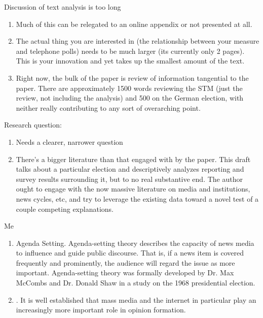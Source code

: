 \documentclass[12pt,a4paper,notitlepage]{article}
\begin{document}
Discussion of text analysis is too long
\begin{enumerate}
	\item Much of this can be relegated to an online appendix or not presented at all. 
	\item The actual thing you are interested in (the relationship between your measure and telephone polls) needs to be much larger (its currently only 2 pages). This is your innovation and yet takes up the smallest amount of the text. 
	\item Right now, the bulk of the paper is review of information tangential to the paper. There are approximately 1500 words reviewing the STM (just the review, not including the analysis) and 500 on the German election, with neither really contributing to any sort of overarching point. 
\end{enumerate}

Research question:
\begin{enumerate}
	\item Needs a clearer, narrower question 
	\item There's a bigger literature than that engaged with by the paper. This draft talks about a particular election and descriptively analyzes reporting and survey results surrounding it, but to no real substantive end. The author ought to engage with the now massive literature on media and institutions, news cycles, etc, and try to leverage the existing data toward a novel test of a couple competing explanations. 
\end{enumerate}


Me

\begin{enumerate}
	\item Agenda Setting.  Agenda-setting theory describes the capacity of news media to influence and guide public discourse. That is, if a news item is covered frequently and prominently, the audience will regard the issue as more important. Agenda-setting theory was formally developed by Dr. Max McCombs and Dr. Donald Shaw in a study on the 1968 presidential election. \citep{duru_relevance_2018}
	\item . It is well established that mass media and the internet in particular play an increasingly more important role in opinion formation. \citep{savigny_public_2002}
\end{enumerate}
\end{document}
